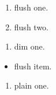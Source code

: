 \documentclass{article}
\begin{document}
\begin{enumerate}[leftmargin=*]
\item flush one.
\item flush two.
\end{enumerate}
\begin{enumerate}[leftmargin=2em]
\item dim one.
\end{enumerate}
\begin{itemize}[leftmargin=*]
\item flush item.
\end{itemize}
\begin{enumerate}
\item plain one.
\end{enumerate}
\end{document}
